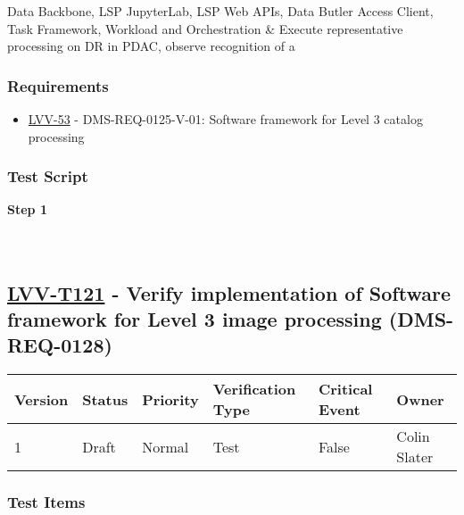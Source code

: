 Data Backbone, LSP JupyterLab, LSP Web APIs, Data Butler Access Client,
Task Framework, Workload and Orchestration \& Execute representative
processing on DR in PDAC, observe recognition of a

\hypertarget{requirements-97}{%
\subsubsection{Requirements}\label{requirements-97}}

\begin{itemize}
\tightlist
\item
  \href{https://jira.lsstcorp.org/browse/LVV-53}{LVV-53} -
  DMS-REQ-0125-V-01: Software framework for Level 3 catalog processing
\end{itemize}

\hypertarget{test-script-97}{%
\subsubsection{Test Script}\label{test-script-97}}

\textbf{Step 1}\\
~\\
~\\

\hypertarget{lvv-t121---verify-implementation-of-software-framework-for-level-3-image-processing-dms-req-0128}{%
\subsection{\texorpdfstring{\href{https://jira.lsstcorp.org/secure/Tests.jspa\#/testCase/LVV-T121}{LVV-T121}
- Verify implementation of Software framework for Level 3 image
processing
(DMS-REQ-0128)}{LVV-T121 - Verify implementation of Software framework for Level 3 image processing (DMS-REQ-0128)}}\label{lvv-t121---verify-implementation-of-software-framework-for-level-3-image-processing-dms-req-0128}}

\begin{longtable}[]{@{}llllll@{}}
\toprule
Version & Status & Priority & Verification Type & Critical Event &
Owner\tabularnewline
\midrule
\endhead
1 & Draft & Normal & Test & False & Colin Slater\tabularnewline
\bottomrule
\end{longtable}

\hypertarget{test-items-97}{%
\subsubsection{Test Items}\label{test-items-97}}

